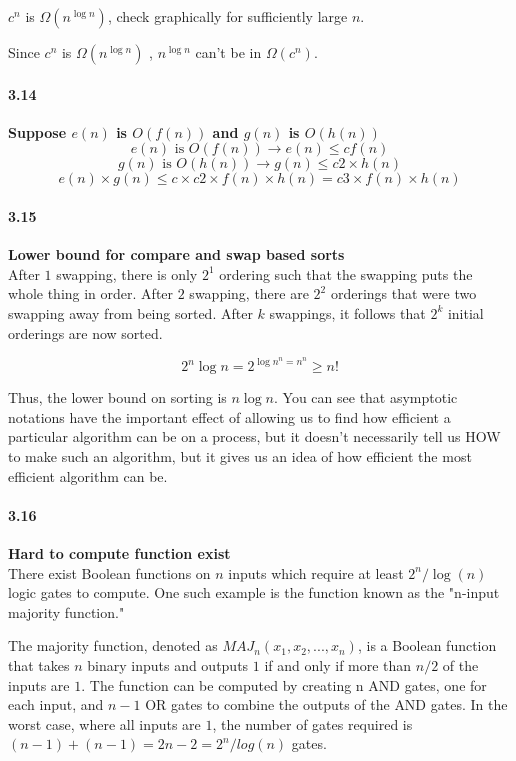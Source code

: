 $c^n$  is $\Omega(n^{\log n})$, check graphically for sufficiently large $n$.

Since $c^n$ is $\Omega(n^{\log n})$ , $n^{\log n}$ can't be in $\Omega(c^n)$.

\paragraph{3.14} \textbf{Suppose $e(n)$ is $O(f(n))$ and $g(n)$ is $O(h(n))$}
\\

$$e(n) \text{ is } O(f(n)) \rightarrow e(n) \le cf(n)$$
$$ g(n) \text{ is } O(h(n)) \rightarrow g(n) \le c2\times h(n)$$ 
$$ e(n) \times g(n) \le c\times c2 \times f(n) \times h(n) = c3 \times f(n) \times h(n)$$

\paragraph{3.15} \textbf{Lower bound for compare and swap based sorts}
\\

After $1$ swapping, there is only $2^1$ ordering such that the swapping puts the whole thing in order. After $2$ swapping, there are $2^2$ orderings that were two swapping away from being sorted. After $k$ swappings, it follows that $2^k$ initial orderings are now sorted. 
        
$$ 2^n \log n = 2^{\log n^n = n^{n}} \ge n! $$
        
Thus, the lower bound on sorting is $ n \log n$. You can see that asymptotic notations have the important effect of allowing us to find how efficient a particular algorithm can be on a process, but it doesn’t necessarily tell us HOW to make such an algorithm, but it gives us an idea of how efficient the most efficient algorithm can be. 





\paragraph{3.16} \textbf{Hard to compute function exist}
\\
There exist Boolean functions on $n$ inputs which require at least $2^n/\log(n)$ logic gates to compute. One such example is the function known as the "n-input majority function."

The majority function, denoted as $MAJ_n(x_1, x_2, ..., x_n)$, is a Boolean function that takes $n$ binary inputs and outputs $1$ if and only if more than $n/2$ of the inputs are $1$. The function can be computed by creating n AND gates, one for each input, and $n-1$ OR gates to combine the outputs of the AND gates. In the worst case, where all inputs are $1$, the number of gates required is $(n-1) + (n-1) = 2n - 2 = 2^n/log(n)$ gates.

